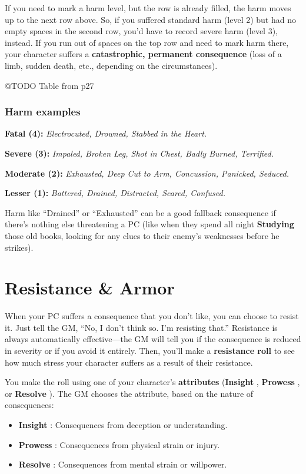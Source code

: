 \documentclass[11pt,oneside]{book}
\newcommand{\gameterm}[1]{\textbf{#1}}
\begin{document}
If you need to mark a harm level, but the row is already filled, the harm moves up to the next row above. So, if you suffered standard harm (level 2) but had no empty spaces in the second row, you’d have to record severe harm (level 3), instead. If you run out of spaces on the top row and need to mark harm there, your character suffers a \textbf{catastrophic, permanent consequence} (loss of a limb, sudden death, etc., depending on the circumstances).

@TODO Table from p27


\subsection{Harm examples}

\textbf{Fatal (4):} \emph{Electrocuted, Drowned, Stabbed in the Heart.}

\textbf{Severe (3):} \emph{Impaled, Broken Leg, Shot in Chest, Badly Burned, Terrified.}

\textbf{Moderate (2):} \emph{Exhausted, Deep Cut to Arm, Concussion, Panicked, Seduced.}

\textbf{Lesser (1):} \emph{Battered, Drained, Distracted, Scared, Confused.}

Harm like “Drained” or “Exhausted” can be a good fallback consequence if there’s nothing else threatening a PC (like when they spend all night \gameterm{Studying}  those old books, looking for any clues to their enemy’s weaknesses before he strikes).

\chapter{Resistance \& Armor}

When your PC suffers a consequence that you don’t like, you can choose to resist it. Just tell the GM, “No, I don’t think so. I’m resisting that.” Resistance is always automatically effective---the GM will tell you if the consequence is reduced in severity or if you avoid it entirely. Then, you’ll make a \textbf{resistance roll} to see how much stress your character suffers as a result of their resistance.

You make the roll using one of your character’s \textbf{attributes} (\gameterm{Insight} , \gameterm{Prowess} , or \gameterm{Resolve} ). The GM chooses the attribute, based on the nature of consequences:

\begin{itemize}
	\item \gameterm{Insight} : Consequences from deception or understanding.
	\item \gameterm{Prowess} : Consequences from physical strain or injury.
	\item \gameterm{Resolve} : Consequences from mental strain or willpower.
\end{itemize}
\end{document}
